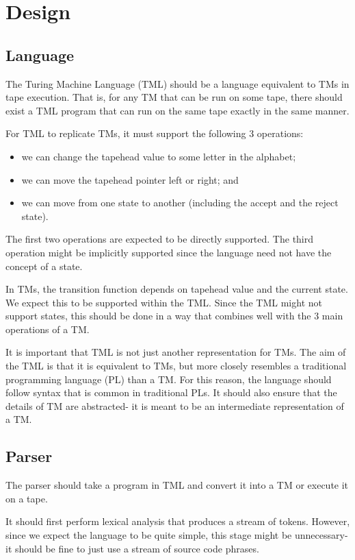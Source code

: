 \chapter{Design}
\section{Language}

The Turing Machine Language (TML) should be a language equivalent to TMs in tape execution. That is, for any TM that can be run on some tape, there should exist a TML program that can run on the same tape exactly in the same manner.

For TML to replicate TMs, it must support the following 3 operations:
\begin{itemize}
    \item we can change the tapehead value to some letter in the alphabet;
    \item we can move the tapehead pointer left or right; and
    \item we can move from one state to another (including the accept and the reject state).
\end{itemize}
The first two operations are expected to be directly supported. The third operation might be implicitly supported since the language need not have the concept of a state.

In TMs, the transition function depends on tapehead value and the current state. We expect this to be supported within the TML. Since the TML might not support states, this should be done in a way that combines well with the 3 main operations of a TM.

It is important that TML is not just another representation for TMs. The aim of the TML is that it is equivalent to TMs, but more closely resembles a traditional programming language (PL) than a TM. For this reason, the language should follow syntax that is common in traditional PLs. It should also ensure that the details of TM are abstracted- it is meant to be an intermediate representation of a TM.

\section{Parser}
The parser should take a program in TML and convert it into a TM or execute it on a tape. 

It should first perform lexical analysis that produces a stream of tokens. However, since we expect the language to be quite simple, this stage might be unnecessary- it should be fine to just use a stream of source code phrases.

